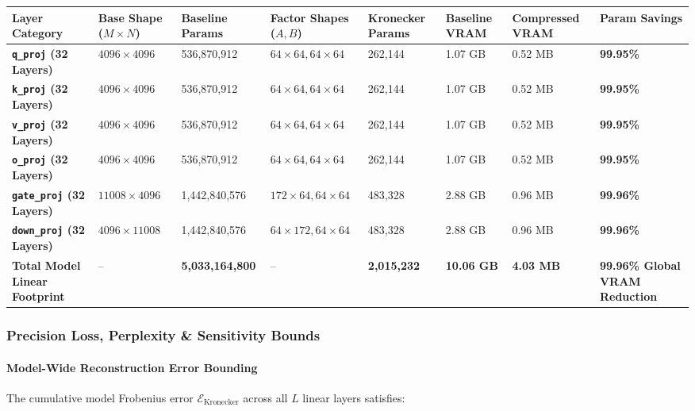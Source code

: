 \begin{center}
\begin{adjustbox}{max width=\columnwidth}
\renewcommand{\arraystretch}{1.2}
\begin{tabular}{llllllll}
\toprule
Layer Category & Base Shape ($M \times N$) & Baseline Params & Factor Shapes ($A, B$) & Kronecker Params & Baseline VRAM & Compressed VRAM & Param Savings \\
\midrule
\textbf{\texttt{q\_proj} (32 Layers)} & $4096 \times 4096$ & 536,870,912 & $64 \times 64, 64 \times 64$ & 262,144 & 1.07 GB & 0.52 MB & \textbf{99.95\%} \\
\textbf{\texttt{k\_proj} (32 Layers)} & $4096 \times 4096$ & 536,870,912 & $64 \times 64, 64 \times 64$ & 262,144 & 1.07 GB & 0.52 MB & \textbf{99.95\%} \\
\textbf{\texttt{v\_proj} (32 Layers)} & $4096 \times 4096$ & 536,870,912 & $64 \times 64, 64 \times 64$ & 262,144 & 1.07 GB & 0.52 MB & \textbf{99.95\%} \\
\textbf{\texttt{o\_proj} (32 Layers)} & $4096 \times 4096$ & 536,870,912 & $64 \times 64, 64 \times 64$ & 262,144 & 1.07 GB & 0.52 MB & \textbf{99.95\%} \\
\textbf{\texttt{gate\_proj} (32 Layers)} & $11008 \times 4096$ & 1,442,840,576 & $172 \times 64, 64 \times 64$ & 483,328 & 2.88 GB & 0.96 MB & \textbf{99.96\%} \\
\textbf{\texttt{down\_proj} (32 Layers)} & $4096 \times 11008$ & 1,442,840,576 & $64 \times 172, 64 \times 64$ & 483,328 & 2.88 GB & 0.96 MB & \textbf{99.96\%} \\
\textbf{Total Model Linear Footprint} & -- & \textbf{5,033,164,800} & -- & \textbf{2,015,232} & \textbf{10.06 GB} & \textbf{4.03 MB} & \textbf{99.96\% Global VRAM Reduction} \\

\bottomrule
\end{tabular}
\end{adjustbox}
\end{center}

\subsubsection*{Precision Loss, Perplexity \& Sensitivity Bounds}

\paragraph{Model-Wide Reconstruction Error Bounding}
The cumulative model Frobenius error $\mathcal{E}_{\text{Kronecker}}$ across all $L$ linear layers satisfies:

